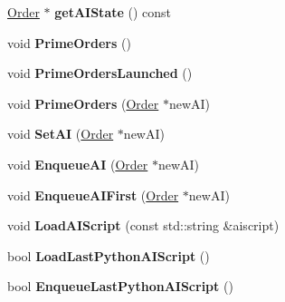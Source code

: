 \begin{DoxyCompactItemize}
\item 
\hyperlink{classOrder}{Order} $\ast$ {\bfseries get\+A\+I\+State} () const \hypertarget{classUnit_a827a069fd6990de3abef7978bd91b8aa}{}\label{classUnit_a827a069fd6990de3abef7978bd91b8aa}

\item 
void {\bfseries Prime\+Orders} ()\hypertarget{classUnit_a4ddf77420f249633e111adc852e652ab}{}\label{classUnit_a4ddf77420f249633e111adc852e652ab}

\item 
void {\bfseries Prime\+Orders\+Launched} ()\hypertarget{classUnit_a34b86317503a92d5387b249957d1b115}{}\label{classUnit_a34b86317503a92d5387b249957d1b115}

\item 
void {\bfseries Prime\+Orders} (\hyperlink{classOrder}{Order} $\ast$new\+AI)\hypertarget{classUnit_a3b393860e88d0ee6b0fc62fb3420849b}{}\label{classUnit_a3b393860e88d0ee6b0fc62fb3420849b}

\item 
void {\bfseries Set\+AI} (\hyperlink{classOrder}{Order} $\ast$new\+AI)\hypertarget{classUnit_a4f56070963733c3794a22972a852ed52}{}\label{classUnit_a4f56070963733c3794a22972a852ed52}

\item 
void {\bfseries Enqueue\+AI} (\hyperlink{classOrder}{Order} $\ast$new\+AI)\hypertarget{classUnit_ad3bdb1564a97d49439169fba06eaf63f}{}\label{classUnit_ad3bdb1564a97d49439169fba06eaf63f}

\item 
void {\bfseries Enqueue\+A\+I\+First} (\hyperlink{classOrder}{Order} $\ast$new\+AI)\hypertarget{classUnit_a010b8c78bc21044cbe711a4623fde57e}{}\label{classUnit_a010b8c78bc21044cbe711a4623fde57e}

\item 
void {\bfseries Load\+A\+I\+Script} (const std\+::string \&aiscript)\hypertarget{classUnit_aa9dfc447b39389bbc0e1b6f98ae2f9b1}{}\label{classUnit_aa9dfc447b39389bbc0e1b6f98ae2f9b1}

\item 
bool {\bfseries Load\+Last\+Python\+A\+I\+Script} ()\hypertarget{classUnit_a2dc15d346ec3fc4424b1f14d9e20775a}{}\label{classUnit_a2dc15d346ec3fc4424b1f14d9e20775a}

\item 
bool {\bfseries Enqueue\+Last\+Python\+A\+I\+Script} ()\hypertarget{classUnit_afda5612f43c8abe25ff981e7b9f231f7}{}\label{classUnit_afda5612f43c8abe25ff981e7b9f231f7}


\end{DoxyCompactItemize}
